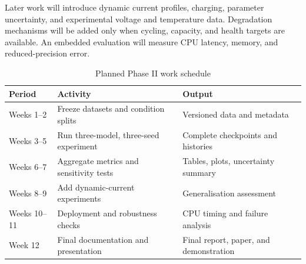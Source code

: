 \documentclass[14pt,a4paper,oneside]{extreport}
\begin{document}
Later work will introduce dynamic current profiles, charging, parameter uncertainty, and experimental voltage and temperature data. Degradation mechanisms will be added only when cycling, capacity, and health targets are available. An embedded evaluation will measure CPU latency, memory, and reduced-precision error.

\begin{table}[htbp]
\centering
\caption{Planned Phase II work schedule}
\small
\begin{tabularx}{\textwidth}{p{}p{}X}
\toprule
Period & Activity & Output\\
\midrule
Weeks 1--2 & Freeze datasets and condition splits & Versioned data and metadata\\
Weeks 3--5 & Run three-model, three-seed experiment & Complete checkpoints and histories\\
Weeks 6--7 & Aggregate metrics and sensitivity tests & Tables, plots, uncertainty summary\\
Weeks 8--9 & Add dynamic-current experiments & Generalisation assessment\\
Weeks 10--11 & Deployment and robustness checks & CPU timing and failure analysis\\
Week 12 & Final documentation and presentation & Final report, paper, and demonstration\\
\bottomrule
\end{tabularx}
\end{table}
\end{document}
